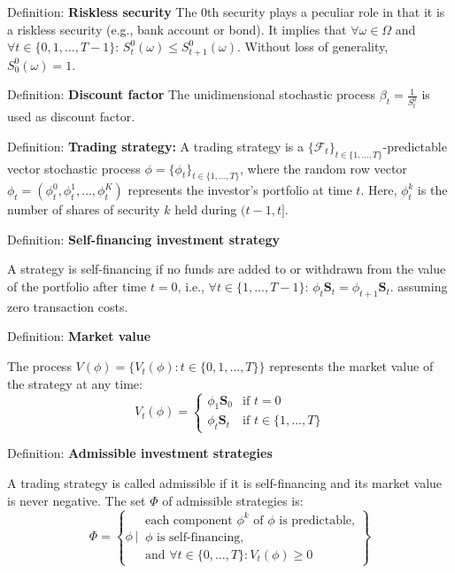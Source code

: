 \documentclass[12pt,a4paper]{article}
\begin{document}
Definition: \textbf{Riskless security}
The 0th security plays a peculiar role in that it is a riskless security (e.g., bank account or bond). It implies that $\forall \omega \in \Omega$ and $\forall t \in \{0, 1, \ldots, T-1\}$: $S_t^0(\omega) \leq S_{t+1}^0(\omega)$. Without loss of generality, $S_0^0(\omega) = 1$.
\vspace{1em}

Definition: \textbf{Discount factor}
The unidimensional stochastic process $\beta_t = \frac{1}{S_t^0}$ is used as discount factor.
\vspace{1em}

Definition: \textbf{Trading strategy:}
A trading strategy is a $\{\mathcal{F}_t\}_{t \in \{1, \ldots, T\}}$-predictable vector stochastic process $\phi = \{\phi_t\}_{t \in \{1, \ldots, T\}}$, where the random row vector $\phi_t = (\phi_t^0, \phi_t^1, \ldots, \phi_t^K)$ represents the investor's portfolio at time $t$. Here, $\phi_t^k$ is the number of shares of security $k$ held during $(t-1,t]$.
\vspace{1em}

Definition: \textbf{Self-financing investment strategy}
\vspace{0.5em}

A strategy is self-financing if no funds are added to or withdrawn from the value of the portfolio after time $t = 0$, i.e., $\forall t \in \{1, \ldots, T-1\}$: $\phi_t \mathbf{S}_t = \phi_{t+1} \mathbf{S}_t$. assuming zero transaction costs.
\vspace{1em}

Definition: \textbf{Market value}
\vspace{0.5em}

The process $V(\phi) = \{V_t(\phi) : t \in \{0, 1, \ldots, T\}\}$ represents the market value of the strategy at any time:
\[
V_t(\phi) = \begin{cases} \phi_1 \mathbf{S}_0 & \text{if } t = 0 \\ \phi_t \mathbf{S}_t & \text{if } t \in \{1, \ldots, T\} \end{cases}
\]
\vspace{1em}

Definition: \textbf{Admissible investment strategies}
\vspace{0.5em}

A trading strategy is called admissible if it is self-financing and its market value is never negative. The set $\Phi$ of admissible strategies is:
\[
\Phi = \left\{ \phi \,\bigg|\, \begin{array}{l} \text{each component } \phi^k \text{ of } \phi \text{ is predictable,} \\ \phi \text{ is self-financing,} \\ \text{and } \forall t \in \{0, \ldots, T\}: V_t(\phi) \geq 0 \end{array} \right\}
\]
\vspace{1em}
\end{document}
